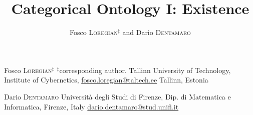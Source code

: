 \documentclass[a4paper,9pt]{../birkjour}
\title{Categorical Ontology I: Existence}
\author{Fosco \textsc{Loregian}$^\ddag$ and Dario \textsc{Dentamaro}}
\begin{document}
\scriptsize

\maketitle

\begin{minipage}{.4\textwidth}
  Fosco \textsc{Loregian}$^\ddag$\newline 
  $^\ddag$corresponding author. \newline 
Tallinn University of Technology,\newline %
Institute of Cybernetics,\newline 
\url{fosco.loregian@taltech.ee}
Tallinn, Estonia 
\end{minipage}\hfill %
\begin{minipage}{.4\textwidth}
  Dario \textsc{Dentamaro} \newline 
  Università degli Studi di Firenze,\newline 
  Dip. di Matematica e Informatica, \newline 
  Firenze, Italy\newline
  \url{dario.dentamaro@stud.unifi.it}
\end{minipage}
\end{document}
